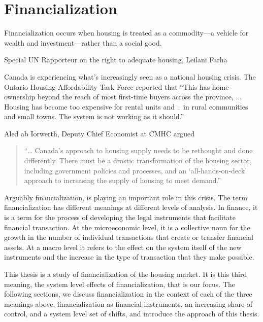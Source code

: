 \chapter{Financialization} \label{chapter-financialization}
\epigraph{Financialization  occurs when housing is treated as a commodity—a vehicle for wealth and investment—rather than a social good.}{Special UN Rapporteur on the right to adequate housing, Leilani Farha}


Canada is experiencing what's increasingly seen as a national housing crisis. The Ontario Housing Affordability Task Force reported that ``This has home ownership beyond the reach of most first-time buyers across the province, ... Housing has become too expensive for rental units and ..  in rural communities and small towns. The system is not working as it should.''

Aled ab Iorwerth, Deputy Chief Economist at CMHC argued
\begin{quotation}
     “… Canada’s approach to housing supply needs to be rethought and done differently. There must be a drastic transformation of the housing sector, including government policies and processes, and an ‘all-hands-on-deck’ approach to increasing the supply of housing to meet demand.”\cite{CanadaHousingSupply2022}
\end{quotation}

Arguably financialization, %
is playing an important role in this crisis. The term financialization has different meanings at different levels of analysis. In finance, it is a term for the process of developing the legal instruments that facilitate financial transaction. At the microeconomic level, it is a collective noun for the growth in the number of individual transactions that create or transfer financial assets. At a macro level it refers to the effect on the system itself of the new instruments and the increase in the type of transaction that they make possible.

This thesis is a study of financialization of the housing market. It is this third meaning, the system level effects of financialization, that is our focus. The following sections, we discuss financialization in the context of each of the three meanings above, financialization as financial instruments, an increasing share of control, and a system level set of shifts, and introduce the approach of this thesis. 

